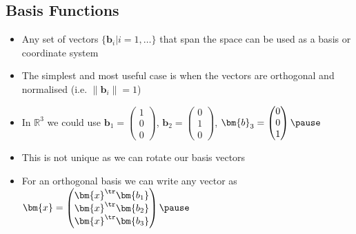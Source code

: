 
\begin{slide}
\section[-2]{Basis Functions}

\begin{PauseHighLight}
  \begin{itemize}
  \item Any set of vectors $\{\bm{b}_i|i=1,\ldots\}$ that span the space
    can be used as a basis or coordinate system\pause
  \item The simplest and most useful case is when the vectors are
    orthogonal and normalised (i.e. $\|\bm{b}_i\|=1$)\pause
  \item In $\mathbb{R}^3$ we could use $\bm{b}_1 =
    \begin{pmatrix}
      1 \\ 0 \\ 0
    \end{pmatrix}$, $\bm{b}_2 =
    \begin{pmatrix}
      0 \\ 1 \\ 0
    \end{pmatrix}$, $\bm{b}_3 =
    \begin{pmatrix}
      0 \\ 0 \\ 1
    \end{pmatrix}\pause$
  \item This is not unique as we can rotate our basis vectors\pause
  \item For an orthogonal basis we can write any vector as $\bm{x} =
    \begin{pmatrix}
      \bm{x}^\tr\bm{b_1} \\ \bm{x}^\tr\bm{b_2} \\ \bm{x}^\tr\bm{b_3}
    \end{pmatrix}\pause$
  \end{itemize}
\end{PauseHighLight}

\end{slide}


